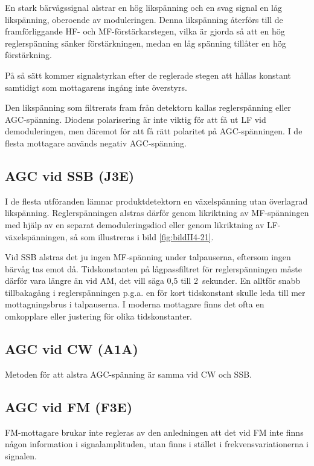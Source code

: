 En stark bärvågssignal alstrar en hög likspänning och en svag signal
en låg likspänning, oberoende av moduleringen.
Denna likspänning återförs till de framförliggande HF- och MF-förstärkarstegen,
vilka är gjorda så att en hög reglerspänning sänker förstärkningen, medan en
låg spänning tillåter en hög förstärkning.

På så sätt kommer signalstyrkan efter de reglerade stegen att hållas
konstant samtidigt som mottagarens ingång inte överstyrs.

Den likspänning som filtrerats fram från detektorn kallas reglerspänning eller
AGC-spänning.
Diodens polarisering är inte viktig för att få ut LF vid demoduleringen, men
däremot för att få rätt polaritet på AGC-spänningen.
I de flesta mottagare används negativ AGC-spänning.

\subsection{AGC vid SSB (J3E)}

I de flesta utföranden lämnar produktdetektorn en växelspänning utan
överlagrad likspänning.
Reglerspänningen alstras därför genom likriktning av MF-spänningen med hjälp
av en separat demoduleringsdiod eller genom likriktning av LF-växelspänningen,
så som illustreras i bild \ref{fig:bildII4-21}.

Vid SSB alstras det ju ingen MF-spänning under talpauserna, eftersom
ingen bärvåg tas emot då.
Tidskonstanten på lågpassfiltret för reglerspänningen måste därför vara längre
än vid AM, det vill säga 0,5 till 2~sekunder.
En alltför snabb tillbakagång i reglerspänningen p.g.a. en för kort
tidskonstant skulle leda till mer mottagningsbrus i talpauserna.
I moderna mottagare finns det ofta en omkopplare eller justering för olika
tidskonstanter.

\subsection{AGC vid CW (A1A)}

Metoden för att alstra AGC-spänning är samma vid CW och SSB.

\subsection{AGC vid FM (F3E)}

FM-mottagare brukar inte regleras av den anledningen att det vid FM
inte finns någon information i signalamplituden, utan finns i stället
i frekvensvariationerna i signalen.

